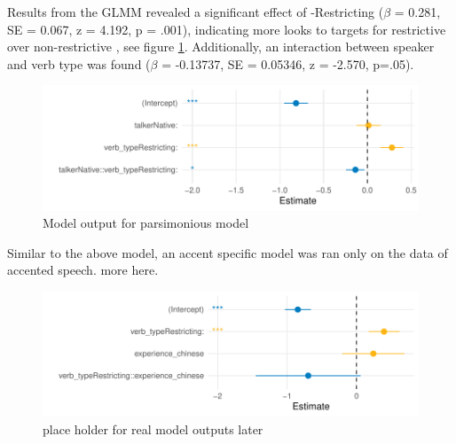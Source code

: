 Results from the GLMM revealed a significant effect of  -Restricting  ($\beta$ = 0.281, SE = 0.067, z = 4.192, p = .001), indicating more looks to targets for restrictive  over non-restrictive , see figure \ref{fig:GLMER_base_model}. Additionally, an interaction between speaker and verb type was found ($\beta$ = -0.13737, SE = 0.05346, z = -2.570, p=.05).
\begin{figure}[H]
    \centering
    \includegraphics[width=\textwidth]{figures/GLMER_base_model.pdf}
    \caption{Model output for parsimonious model}
    \label{fig:GLMER_base_model}
\end{figure}
 Similar to the above model, an accent specific model was ran only on the data of accented speech. more here.
\begin{figure}[H]
    \centering
    \includegraphics[width=\textwidth]{figures/GLMER_accent_model.pdf}
    \caption{place holder for real model outputs later}
    \label{fig:GLMER_accent_model}
\end{figure}

